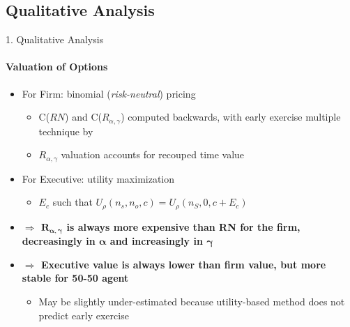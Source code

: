 \documentclass[compress]{beamer}
\begin{document}
\subsection{Qualitative Analysis}
\begin{frame}{1. Qualitative Analysis}
    \framesubtitle{Valuation of Options}

    \begin{itemize}
        \item For Firm: binomial (\textit{risk-neutral}) pricing
        \begin{itemize}
            \item C($RN$) and C($R_{\alpha, \gamma}$) computed backwards, with early exercise multiple technique by \citet{hull2004value}
            \item $R_{\alpha, \gamma}$ valuation accounts for recouped time value
        \end{itemize}
        \item For Executive: utility maximization
        \begin{itemize}
            \item $E_c$ such that $U_\rho(n_s, n_o, c) = U_\rho(n_S, 0, c + E_c)$
        \end{itemize} 
        \vspace*{5pt}
        \pause
        \item \textbf{ $\Rightarrow$ $\boldsymbol{R_{\alpha, \gamma}}$ is always more expensive than RN for the firm, decreasingly in $\boldsymbol{\alpha}$ and increasingly in $\boldsymbol{\gamma}$ }
        \pause
        \item \textbf{ $\Rightarrow$ Executive value is always lower than firm value, but more stable for 50-50 agent}
        \begin{itemize}
            \item May be slightly under-estimated because utility-based method does not predict early exercise \citep{grasselli2009risk}
        \end{itemize}
    \end{itemize}
\end{frame}
\end{document}
